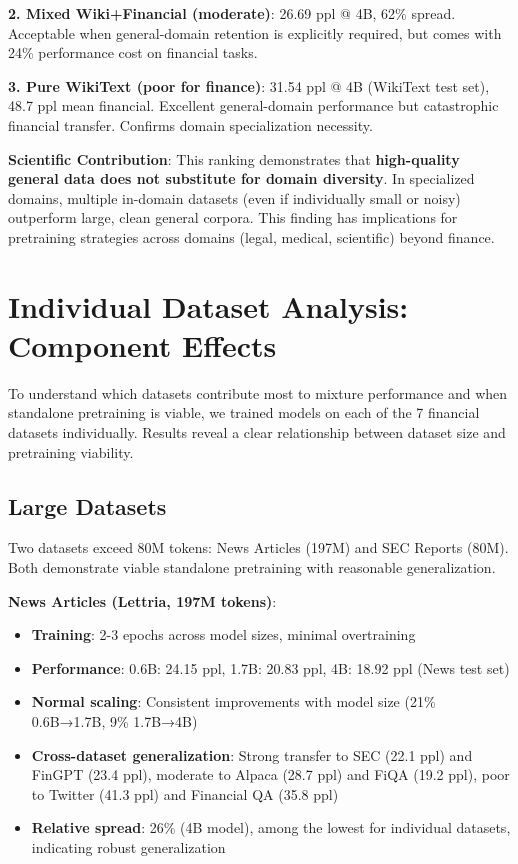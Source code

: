 \textbf{2. Mixed Wiki+Financial (moderate)}: 26.69 ppl @ 4B, 62\% spread. Acceptable when general-domain retention is explicitly required, but comes with 24\% performance cost on financial tasks.

\textbf{3. Pure WikiText (poor for finance)}: 31.54 ppl @ 4B (WikiText test set), 48.7 ppl mean financial. Excellent general-domain performance but catastrophic financial transfer. Confirms domain specialization necessity.

\textbf{Scientific Contribution}: This ranking demonstrates that \textbf{high-quality general data does not substitute for domain diversity}. In specialized domains, multiple in-domain datasets (even if individually small or noisy) outperform large, clean general corpora. This finding has implications for pretraining strategies across domains (legal, medical, scientific) beyond finance.

\section{Individual Dataset Analysis: Component Effects}

To understand which datasets contribute most to mixture performance and when standalone pretraining is viable, we trained models on each of the 7 financial datasets individually. Results reveal a clear relationship between dataset size and pretraining viability.

\subsection{Large Datasets}

Two datasets exceed 80M tokens: News Articles (197M) and SEC Reports (80M). Both demonstrate viable standalone pretraining with reasonable generalization.

\textbf{News Articles (Lettria, 197M tokens)}:
\begin{itemize}
\item \textbf{Training}: 2-3 epochs across model sizes, minimal overtraining
\item \textbf{Performance}: 0.6B: 24.15 ppl, 1.7B: 20.83 ppl, 4B: 18.92 ppl (News test set)
\item \textbf{Normal scaling}: Consistent improvements with model size (21\% 0.6B→1.7B, 9\% 1.7B→4B)
\item \textbf{Cross-dataset generalization}: Strong transfer to SEC (22.1 ppl) and FinGPT (23.4 ppl), moderate to Alpaca (28.7 ppl) and FiQA (19.2 ppl), poor to Twitter (41.3 ppl) and Financial QA (35.8 ppl)
\item \textbf{Relative spread}: 26\% (4B model), among the lowest for individual datasets, indicating robust generalization
\end{itemize}

